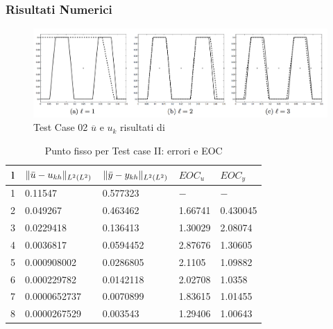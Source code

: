 \subsubsection{Risultati Numerici}
\begin{figure}
\centering
\includegraphics[width=\linewidth]{img/cap6/TestCase02_ues_paper}
\caption{Test Case 02 $\overline{u}$ e $u_k$ risultati di \cite{MAIN}}
\label{fig:503}
\end{figure}

\begin{table}
\caption{Punto fisso per Test case II: errori e EOC }
\label{puntofissoII}
\centering

\begin{tabular}{cllll}
\toprule
{l}           &  {$ \lVert\bar{u}-u_{kh}\rVert_{L^2(L^2)} $} &  {$ \lVert\bar{y}-y_{kh}\rVert_{L^2(L^2)} $} &  {$ EOC_{u} $} &  {$ EOC_y $} \\
\midrule
1            &  0.11547 &  0.577323 &  {$-$} &  {$-$} \\
2            &  0.049267 &  0.463462 &  1.66741 &  0.430045 \\
3            &  0.0229418 &  0.136413 &  1.30029 &  2.08074 \\
4            &  0.0036817 &  0.0594452 &  2.87676 &  1.30605 \\
5            &  0.000908002 &  0.0286805 &  2.1105 &  1.09882 \\
6            &  0.000229782  &  0.0142118 &  2.02708 &  1.0358 \\
7            &  0.0000652737 &  0.0070899 &  1.83615 &  1.01455 \\      
8            &  0.0000267529 &  0.003543 &  1.29406 &  1.00643 \\
\bottomrule
\end{tabular}              

\end{table}


